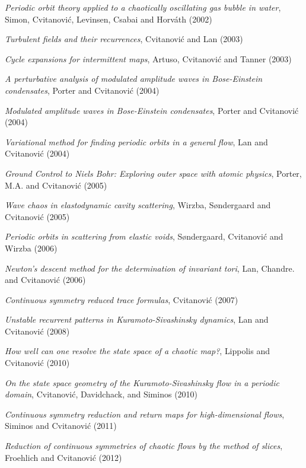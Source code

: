 {{
{\em Periodic orbit theory applied to a chaotically oscillating gas
bubble in water},
{Simon, Cvitanovi{\'c}, Levinsen, Csabai and Horv\'ath}
{(2002)}

{\em Turbulent fields and their recurrences},
{Cvitanovi{\'c} and Lan}
{(2003)}

{\em Cycle expansions for intermittent maps},
{Artuso, Cvitanovi{\'c} and Tanner}
{(2003)}

{\em A perturbative analysis of modulated amplitude waves in {Bose-Einstein} condensates},
{Porter and Cvitanovi{\'c}}
{(2004)}

{\em Modulated amplitude waves in {Bose-Einstein} condensates},
{Porter and Cvitanovi{\'c}}
{(2004)}

{\em Variational method for finding periodic orbits in a general flow},
{Lan and Cvitanovi{\'c}}
{(2004)}

{\em {Ground Control} to {Niels Bohr: Exploring} outer space with atomic physics},
{Porter, M.A. and Cvitanovi{\'c}}
{(2005)}

{\em Wave chaos in elastodynamic cavity scattering},
{Wirzba, S{\o}ndergaard and Cvitanovi{\'c}}
{(2005)}

{\em Periodic orbits in scattering from elastic voids},
{S{\o}ndergaard, Cvitanovi{\'c} and Wirzba}
{(2006)}

{\em {Newton}'s descent method for the determination of invariant tori},
{Lan, Chandre. and Cvitanovi{\'c}}
{(2006)}

{\em Continuous symmetry reduced trace formulas},
{Cvitanovi{\'c}}
{(2007)}

{\em Unstable recurrent patterns in {Kuramoto-Sivashinsky} dynamics},
{Lan and Cvitanovi{\'c}}
{(2008)}

{\em How well can one resolve the state space of a chaotic map?},
{Lippolis and Cvitanovi{\'c}}
{(2010)}

{\em On the state space geometry of the {Kuramoto-Sivashinsky} flow in a periodic domain},
{Cvitanovi{\'c}, Davidchack, and Siminos}
{(2010)}

{\em Continuous symmetry reduction and return maps for high-dimensional flows},
{Siminos and Cvitanovi{\'c}}
{(2011)}

{\em Reduction of continuous symmetries of chaotic flows by the method of
slices},
{Froehlich and Cvitanovi{\'c}}
{(2012)}

}}
